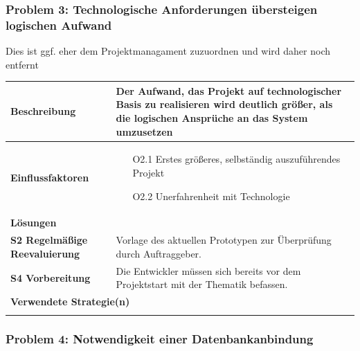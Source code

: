 \documentclass[fontsize=12pt,paper=a4,twoside]{scrartcl}
\begin{document}
\subsubsection{Problem 3: Technologische Anforderungen übersteigen logischen Aufwand}
\huge
Dies ist ggf. eher dem Projektmanagament zuzuordnen und wird daher noch entfernt
\normalsize
\begin{tabularx}{\textwidth}{|p{6cm}|X|}
 \hline
 \textbf{Beschreibung} & Der Aufwand, das Projekt auf technologischer Basis zu realisieren wird deutlich größer, als die logischen Ansprüche an das System umzusetzen\\\hline
 \textbf{Einflussfaktoren} &
 \begin{itemize}
 \item[O2.1] Erstes größeres, selbständig auszuführendes Projekt
 \item[O2.2] Unerfahrenheit mit Technologie
 \end{itemize}\\\hline
\multicolumn{2}{|l|}{\textbf{Lösungen}} \\\hline

\textbf{S2 Regelmäßige Reevaluierung} & Vorlage des aktuellen Prototypen zur Überprüfung durch Auftraggeber. \\
\textbf{S4 Vorbereitung} & Die Entwickler müssen sich bereits vor dem Projektstart mit der Thematik befassen. \\\hline
\multicolumn{2}{|l|}{\textbf{Verwendete Strategie(n)}} \\\hline
    & \\\hline

\end{tabularx}
\newpage


\subsubsection{Problem 4: Notwendigkeit einer Datenbankanbindung}
\end{document}
